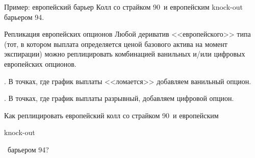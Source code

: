 \documentclass{beamer}
\newcommand{\en}[1]{\begin{otherlanguage}{english}#1\end{otherlanguage}}
\newcommand{\usdrubstrike}{90}
\newcommand{\usdrubbarrier}{94}
\begin{document}
\begin{frame}{Пример: европейский барьер}
\justify
Колл со страйком \usdrubstrike\ и европейским knock-out барьером \usdrubbarrier.

\centering
\end{frame}



\begin{frame}{Репликация европейских опционов}
\justify
Любой дериватив <<европейского>> типа (тот, в котором выплата определяется ценой 
базового актива на момент экспирации) можно реплицировать комбинацией ванильных и/или
цифровых европейских опционов.

. В точках, где график выплаты <<ломается>> добавляем ванильный опцион.

. В точках, где график выплаты разрывный, добавляем цифровой опцион.

\justify
Как реплицировать европейский колл со страйком \usdrubstrike\ и европейским \en{knock-out}\
барьером \usdrubbarrier?
\end{frame}
\end{document}
